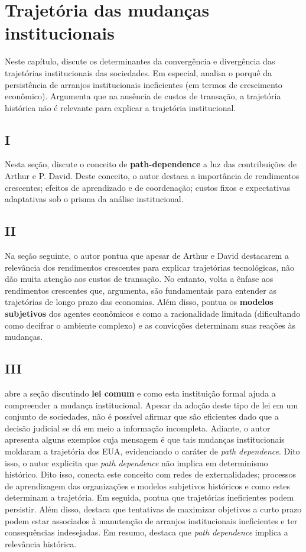 \section*{Trajetória das mudanças institucionais}

Neste capítulo, \autor discute os determinantes da convergência e divergência das trajetórias institucionais das sociedades. Em especial, analisa o porquê da persistência de arranjos institucionais ineficientes (em termos de crescimento econômico). Argumenta que na ausência de custos de transação, a trajetória histórica não é relevante para explicar a trajetória institucional.

\subsection*{I}

Nesta seção, \autor discute o conceito de \textbf{path-dependence} a luz das contribuições de Arthur e P. David. Deste conceito, o autor destaca a importância de rendimentos crescentes; efeitos de aprendizado e de coordenação; custos fixos e expectativas adaptativas sob o prisma da análise institucional.

\subsection*{II}

Na seção seguinte, o autor pontua que apesar de Arthur e David destacarem a relevância dos rendimentos crescentes para explicar trajetórias tecnológicas, não dão muita atenção aos custos de transação. No entanto, volta a ênfase aos rendimentos crescentes que, argumenta, são fundamentais para entender as trajetórias de longo prazo das economias. Além disso, pontua os \textbf{modelos subjetivos} dos agentes econômicos e como a racionalidade limitada (dificultando como decifrar o ambiente complexo) e as convicções determinam suas reações às mudanças.

\subsection*{III}

\autor abre a seção discutindo \textbf{lei comum} e como esta instituição formal ajuda a compreender a mudança institucional. Apesar da adoção deste tipo de lei em um conjunto de sociedades, não é possível afirmar que são eficientes dado que a decisão judicial se dá em meio a informação incompleta. Adiante, o autor apresenta alguns exemplos cuja mensagem é que tais mudanças institucionais moldaram a trajetória dos EUA, evidenciando o caráter de \textit{path dependence}. Dito isso, o autor explicita que \textit{path dependence} não implica em determinismo histórico. Dito isso, \autor conecta este conceito com redes de externalidades; processos de aprendizagem das organizações e modelos subjetivos históricos e como estes determinam a trajetória. Em seguida, pontua que trajetórias ineficientes podem persistir. Além disso, destaca que tentativas de maximizar objetivos a curto prazo podem estar associados à manutenção de arranjos institucionais ineficientes e ter consequências indesejadas. Em resumo, destaca que \textit{path dependence} implica a relevância histórica.

